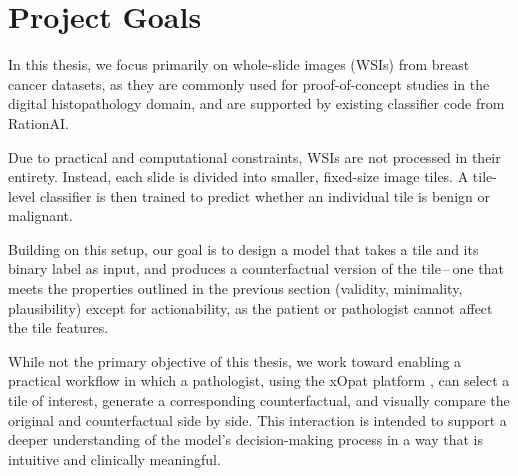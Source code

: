 \section{Project Goals}

In this thesis, we focus primarily on whole-slide images (WSIs) from breast cancer datasets, as they are commonly used for proof-of-concept studies in the digital histopathology domain, and are supported by existing classifier code from RationAI.

Due to practical and computational constraints, WSIs are not processed in their entirety. Instead, each slide is divided into smaller, fixed-size image tiles. A tile-level classifier is then trained to predict whether an individual tile is benign or malignant.

Building on this setup, our goal is to design a model that
takes a tile and its binary label as input,
and produces a counterfactual version of the tile\,--\,one that meets the properties outlined in the previous section
(validity, minimality, plausibility) except for actionability, as the patient or pathologist cannot affect the tile features.

While not the primary objective of this thesis, we work toward enabling a practical workflow in which a pathologist, using the xOpat platform \cite{horak2023xopat}, can select a tile of interest, generate a corresponding counterfactual, and visually compare the original and counterfactual side by side. This interaction is intended to support a deeper understanding of the model’s decision-making process in a way that is intuitive and clinically meaningful.
